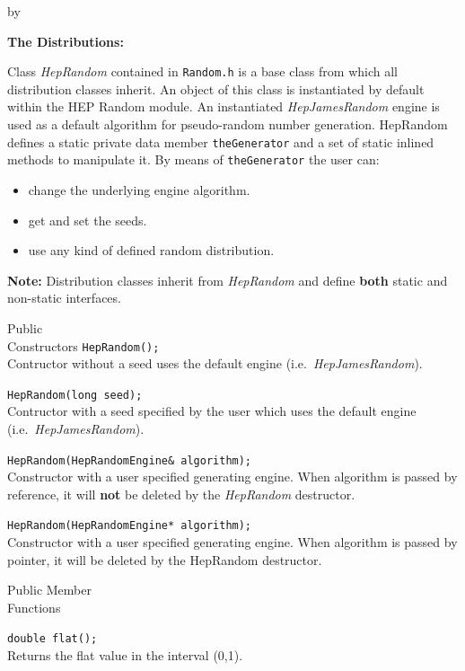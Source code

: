 \documentclass[twoside]{article}
\newcommand{\comp}[1]{\texttt{#1}}%
\newcommand{\entrylabel}[1]{\mbox{\textbf{{#1}}}\hfil}%
\newenvironment{entry}
{\begin{list}{}%
    {\renewcommand{\makelabel}{\entrylabel}%
     \setlength{\labelwidth}{90pt}%
     \setlength{\leftmargin}{\labelwidth}
     \advance\leftmargin by \labelsep%
      }%
    }%
  {\end{list}}
\newcommand{\Entrylabel}[1]%
{\raisebox{0pt}[1ex][0pt]{\makebox[\labelwidth][l]%
    {\parbox[t]{\labelwidth}{\hspace{0pt}\textbf{{#1}}}}}}
\newenvironment{Entry}%
{\renewcommand{\entrylabel}{\Entrylabel}\begin{entry}}%
  {\end{entry}}
\begin{document}
\begin{description}
\begin{Entry}
  {\bf The Distributions:}
  
     Class {\em HepRandom} contained in \comp{Random.h} is a base class
     from which all distribution
     classes inherit.  An object of this class is instantiated by
     default within the HEP Random module.  An instantiated {\em HepJamesRandom}
     engine is used as a default algorithm for pseudo-random number
     generation.  HepRandom defines a static private data member
     \comp{theGenerator} and a set of static inlined methods to
     manipulate it. By means of \comp{theGenerator} the user can:
     \begin{itemize}
        \item change the underlying engine algorithm.
        \item get and set the seeds.
        \item use any kind of defined random distribution.
      \end{itemize}
      {\bf Note:} Distribution classes inherit from {\em HepRandom} and define
      {\bf both} static and non-static interfaces.

\item[Public\\ Constructors]
      \verb+HepRandom();+\\
      Contructor without a seed uses the default engine (i.e.~{\em HepJamesRandom}).

      \verb+HepRandom(long seed);+\\
      Contructor with a seed specified by the user which uses the
      default engine (i.e.~{\em HepJamesRandom}).

      \verb+HepRandom(HepRandomEngine& algorithm);+\\
       Constructor with a user specified generating engine.
       When algorithm is passed by reference, it will {\bf not}
       be deleted by the {\em HepRandom} destructor.

      \verb+HepRandom(HepRandomEngine* algorithm);+\\
      Constructor with a user specified generating engine. When
      algorithm is passed by pointer, it will be deleted by the
      HepRandom destructor.
  
\item[Public Member\\ Functions]

    \verb+double flat();+\\
    Returns the flat value in the interval (0,1).


\end{Entry}
\end{description}
\end{document}
